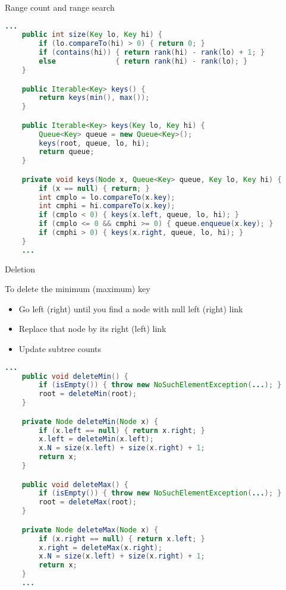 \documentclass[8pt,a4paper,compress]{beamer}
\begin{document}
\begin{frame}[fragile]
Range count and range search
\begin{lstlisting}[language=Java]
    ...
    public int size(Key lo, Key hi) {
        if (lo.compareTo(hi) > 0) { return 0; }
        if (contains(hi)) { return rank(hi) - rank(lo) + 1; }
        else              { return rank(hi) - rank(lo); }
    }

    public Iterable<Key> keys() {
        return keys(min(), max());
    }

    public Iterable<Key> keys(Key lo, Key hi) {
        Queue<Key> queue = new Queue<Key>();
        keys(root, queue, lo, hi);
        return queue;
    } 

    private void keys(Node x, Queue<Key> queue, Key lo, Key hi) { 
        if (x == null) { return; }
        int cmplo = lo.compareTo(x.key); 
        int cmphi = hi.compareTo(x.key); 
        if (cmplo < 0) { keys(x.left, queue, lo, hi); } 
        if (cmplo <= 0 && cmphi >= 0) { queue.enqueue(x.key); }
        if (cmphi > 0) { keys(x.right, queue, lo, hi); }
    } 
    ...
\end{lstlisting}
\end{frame}

\begin{frame}[fragile]
Deletion

\bigskip

To delete the minimum (maximum) key
\begin{itemize}
\item Go left (right) until you find a node with null left (right) link

\item Replace that node by its right (left) link

\item Update subtree counts

\end{itemize}
\begin{lstlisting}[language=Java]
    ...
    public void deleteMin() {
        if (isEmpty()) { throw new NoSuchElementException(...); }
        root = deleteMin(root);
    }

    private Node deleteMin(Node x) {
        if (x.left == null) { return x.right; }
        x.left = deleteMin(x.left);
        x.N = size(x.left) + size(x.right) + 1; 
        return x;
    }

    public void deleteMax() {
        if (isEmpty()) { throw new NoSuchElementException(...); }
        root = deleteMax(root);
    }

    private Node deleteMax(Node x) {
        if (x.right == null) { return x.left; }
        x.right = deleteMax(x.right);
        x.N = size(x.left) + size(x.right) + 1;
        return x;
    }   
    ...
\end{lstlisting}
\end{frame}
\end{document}

